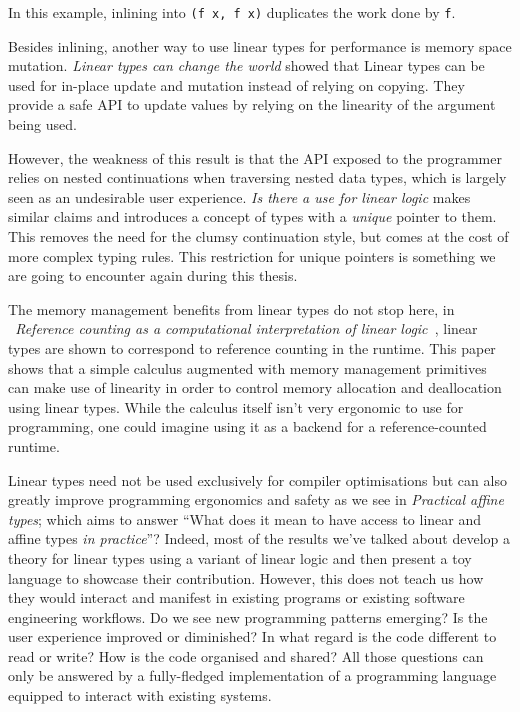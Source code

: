 \documentclass[
]{article}
\begin{document}
In this example, inlining into \texttt{(f\ x,\ f\ x)} duplicates the
work done by \texttt{f}.

Besides inlining, another way to use linear types for performance is
memory space mutation. \emph{Linear types can change the
world}\cite{linear_types_update} showed that Linear types can be used
for in-place update and mutation instead of relying on copying. They
provide a safe API to update values by relying on the linearity of the
argument being used.

However, the weakness of this result is that the API exposed to the
programmer relies on nested continuations when traversing nested data
types, which is largely seen as an undesirable user experience. \emph{Is
there a use for linear logic}\cite{linear_use} makes similar claims and
introduces a concept of types with a \emph{unique} pointer to them. This
removes the need for the clumsy continuation style, but comes at the
cost of more complex typing rules. This restriction for unique pointers
is something we are going to encounter again during this thesis.

The memory management benefits from linear types do not stop here, in
\emph{~Reference counting as a computational interpretation of linear
logic~}\cite{linear_ref_count}, linear types are shown to correspond to
reference counting in the runtime. This paper shows that a simple
calculus augmented with memory management primitives can make use of
linearity in order to control memory allocation and deallocation using
linear types. While the calculus itself isn't very ergonomic to use for
programming, one could imagine using it as a backend for a
reference-counted runtime.

Linear types need not be used exclusively for compiler optimisations but
can also greatly improve programming ergonomics and safety as we see in
\emph{Practical affine types}\cite{affine_types}; which aims to answer
``What does it mean to have access to linear and affine types \emph{in
practice}''? Indeed, most of the results we've talked about develop a
theory for linear types using a variant of linear logic and then present
a toy language to showcase their contribution. However, this does not
teach us how they would interact and manifest in existing programs or
existing software engineering workflows. Do we see new programming
patterns emerging? Is the user experience improved or diminished? In
what regard is the code different to read or write? How is the code
organised and shared? All those questions can only be answered by a
fully-fledged implementation of a programming language equipped to
interact with existing systems.
\end{document}

